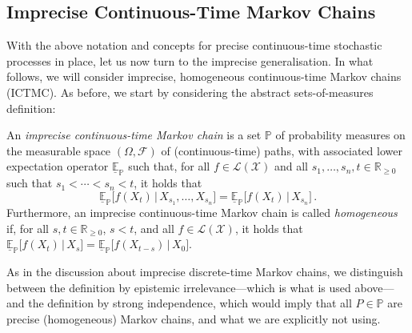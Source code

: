 \documentclass[graybox]{svmult}
\newcommand{\reals}{\mathbb{R}}
\newcommand{\realsnonneg}{\reals_{\geq 0}}
\newcommand{\states}{\mathcal{X}}
\newcommand{\gambles}{\mathcal{L}}
\newcommand{\gamblesX}{\gambles(\states)}
\begin{document}
\subsection{Imprecise Continuous-Time Markov Chains}

With the above notation and concepts for precise continuous-time stochastic processes in place, let us now turn to the imprecise generalisation. In what follows, we will consider imprecise, homogeneous continuous-time Markov chains (ICTMC). As before, we start by considering the abstract sets-of-measures definition:
\begin{definition}\label{def:ictmc_set_measures}
An \emph{imprecise continuous-time Markov chain} is a set $\mathbb{P}$ of probability measures on the measurable space $(\Omega,\mathcal{F})$ of (continuous-time) paths, with associated lower expectation operator $\underline{\mathbb{E}}_\mathbb{P}$ such that, for all $f\in\gamblesX$ and all $s_1,\ldots,s_n,t\in\realsnonneg$ such that $s_1<\cdots<s_n<t$, it holds that
\begin{equation*}
\underline{\mathbb{E}}_\mathbb{P}\bigl[f(X_t)\,\big\vert\,X_{s_1},\ldots,X_{s_n}\bigr] = \underline{\mathbb{E}}_\mathbb{P}\bigl[f(X_t)\,\big\vert\,X_{s_n}\bigr]\,.
\end{equation*}
Furthermore, an imprecise continuous-time Markov chain is called \emph{homogeneous} if, for all $s,t\in\realsnonneg$, $s<t$, and all $f\in\gamblesX$, it holds that $\underline{\mathbb{E}}_\mathbb{P}\bigl[f(X_t)\,\big\vert\,X_s\bigr]=\underline{\mathbb{E}}_\mathbb{P}\bigl[f(X_{t-s})\,\big\vert\,X_0\bigr]$.
\end{definition}
As in the discussion about imprecise discrete-time Markov chains, we distinguish between the definition by epistemic irrelevance---which is what is used above---and the definition by strong independence, which would imply that all $P\in\mathbb{P}$ are precise (homogeneous) Markov chains, and what we are explicitly not using.
\end{document}
